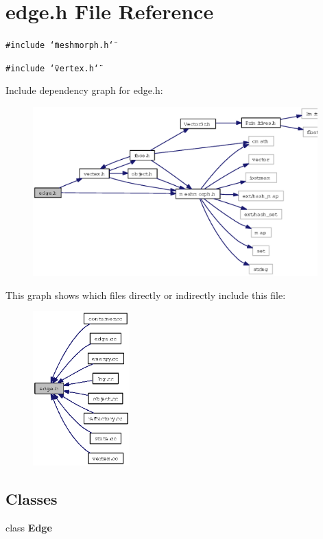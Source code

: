 \section{edge.h File Reference}
\label{edge_8h}
{\tt \#include \char`\"{}meshmorph.h\char`\"{}}\par
{\tt \#include \char`\"{}vertex.h\char`\"{}}\par


Include dependency graph for edge.h:\begin{figure}[H]
\begin{center}
\leavevmode
\includegraphics[width=311pt]{edge_8h__incl}
\end{center}
\end{figure}


This graph shows which files directly or indirectly include this file:\begin{figure}[H]
\begin{center}
\leavevmode
\includegraphics[width=106pt]{edge_8h__dep__incl}
\end{center}
\end{figure}
\subsection*{Classes}
\begin{CompactItemize}
\item 
class {\bf Edge}
\end{CompactItemize}
